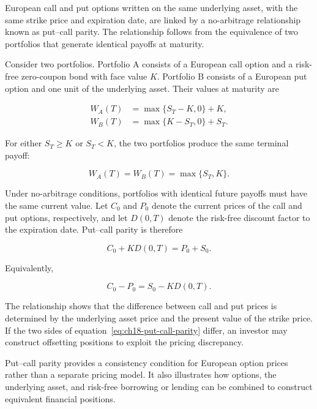 European call and put options written on the same underlying
asset, with the same strike price and expiration date, are
linked by a no-arbitrage relationship known as put--call
parity. The relationship follows from the equivalence of
two portfolios that generate identical payoffs at maturity.

Consider two portfolios. Portfolio A consists of a European
call option and a risk-free zero-coupon bond with face value
$K$. Portfolio B consists of a European put option and one
unit of the underlying asset. Their values at maturity are

\begin{equation*}
\begin{aligned}
W_A(T)&=\max\{S_T-K,0\}+K,\\
W_B(T)&=\max\{K-S_T,0\}+S_T.
\end{aligned}
\end{equation*}

For either $S_T\geq K$ or $S_T<K$, the two portfolios produce
the same terminal payoff:

\begin{equation*}
W_A(T)=W_B(T)=\max\{S_T,K\}.
\end{equation*}

Under no-arbitrage conditions, portfolios with identical
future payoffs must have the same current value. Let $C_0$
and $P_0$ denote the current prices of the call and put
options, respectively, and let $D(0,T)$ denote the
risk-free discount factor to the expiration date. Put--call
parity is therefore

\begin{equation}
C_0+KD(0,T)=P_0+S_0.
\label{eq:ch18-put-call-parity}
\end{equation}

Equivalently,

\begin{equation}
C_0-P_0=S_0-KD(0,T).
\end{equation}

The relationship shows that the difference between call
and put prices is determined by the underlying asset price
and the present value of the strike price. If the two sides
of equation~\eqref{eq:ch18-put-call-parity} differ, an
investor may construct offsetting positions to exploit
the pricing discrepancy.

Put--call parity provides a consistency condition for
European option prices rather than a separate pricing
model. It also illustrates how options, the underlying
asset, and risk-free borrowing or lending can be combined
to construct equivalent financial positions.

